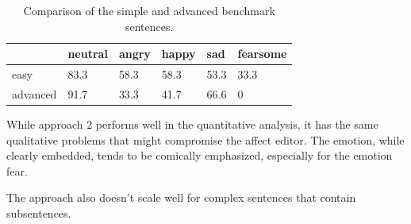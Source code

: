 \documentclass[11pt]{article}
\begin{document}
\begin{table}[h]

\small
\vspace{5px}
{
\begin{tabular}{|l|l|l|l|l|l|}
\hline
\rowcolor{mintgreen}&neutral&angry&happy&sad&fearsome\\
\hline
\cellcolor{gainsboro}easy&83.3&58.3&58.3&53.3&33.3\\
\hline
\cellcolor{gainsboro}advanced&91.7&33.3&41.7&66.6&0\\
\hline
\end{tabular}
}

\caption{Comparison of the simple and advanced benchmark sentences.}
\label{Tabelle}
\end{table}

While approach 2 performs well in the quantitative analysis, it has the same qualitative problems that might compromise the affect editor. The emotion, while clearly embedded, tends to be comically emphasized, especially for the emotion fear.

The approach also doesn't scale well for complex sentences that contain subsentences.
\end{document}
